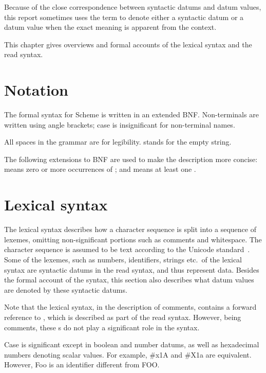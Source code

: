 Because of the close correspondence between syntactic datums and datum
values, this report sometimes uses the term  to denote
either a syntactic datum or a datum value when the exact meaning
is apparent from the context.

This chapter gives overviews and formal accounts of the lexical
syntax and the read syntax.

\section{Notation}
\label{BNF}

The formal syntax for Scheme is written in an extended BNF.
Non-terminals are written using angle brackets; case is insignificant
for non-terminal names.

All spaces in the grammar are for legibility.
 stands for the empty string.

The following extensions to BNF are used to make the description more
concise:   means zero or more occurrences of
; and  means at least one
.

\section{Lexical syntax}
\label{lexicalsyntaxsection}

The lexical syntax describes how a character sequence is split into a
sequence of lexemes, omitting non-significant portions
such as comments and whitespace.  The character sequence is assumed to
be text according to the Unicode standard~\cite{Unicode}.  Some of
the lexemes, such as numbers, identifiers, strings etc.\ of the lexical
syntax are syntactic datums in the read syntax, and thus represent data.
Besides the formal account of the syntax, this section also describes
what datum values are denoted by these syntactic datums.

Note that the lexical syntax, in the description of comments, contains
a forward reference to , which is described as part of the
read syntax.  However, being comments, these s do not play
a significant role in the syntax.

Case is significant except in boolean and number datums, as well as
hexadecimal numbers denoting scalar values.  For example, {\cf \#x1A}
and {\cf \#X1a} are equivalent.  However, {\cf Foo} is an identifier
different from {\cf FOO}.

